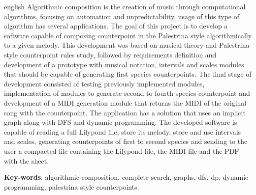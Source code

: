 \begin{resumo}[Abstract]
 \begin{otherlanguage*}{english}
   Algorithmic composition is the creation of music through computational algorithms, focusing on automation and unpredictability, usage of this type of algorithm has several applications. The goal of this project is to develop a software capable of composing counterpoint in the Palestrina style algorithmically to a given melody. This development was based on musical theory and Palestrina style counterpoint rules study, followed by requirements definition and development of a prototype with musical notation, intervals and scales modules that should be capable of generating first species counterpoints. The final stage of development consisted of testing previously implemented modules, implementation of modules to generate second to fourth species counterpoint and development of a MIDI generation module that returns the MIDI of the original song with the counterpoint. The application has a solution that uses an implicit graph along with DFS and dynamic programming. The developed software is capable of reading a full Lilypond file, store its melody, store and use intervals and scales, generating counterpoints of first to second species and sending to the user a compacted file containing the Lilypond file, the MIDI file and the PDF with the sheet.

   \vspace{\onelineskip}

   \noindent
   \textbf{Key-words}: algorithmic composition, complete search, graphs, dfs, dp, dynamic programming, palestrina style counterpoints.
 \end{otherlanguage*}
\end{resumo}
